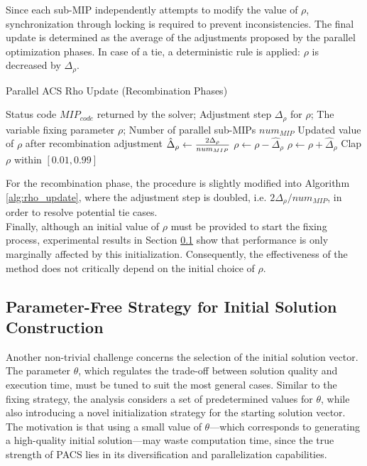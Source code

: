 Since each sub-MIP independently attempts to modify the value of $\rho$, synchronization through locking is required to prevent inconsistencies. The final update is determined as the average of the adjustments proposed by the parallel optimization phases. In case of a tie, a deterministic rule is applied: $\rho$ is decreased by $\Delta_\rho$.  
\begin{algorithm}[H]
\caption{Parallel ACS Rho Update (Recombination Phases)}\label{alg:rho_update}
\begin{algorithmic}[1]
\Require Status code $MIP_{code}$ returned by the solver; Adjustment step $\Delta_\rho$ for $\rho$; The variable fixing parameter $\rho$; Number of parallel sub-MIPs $num_{MIP}$
\Ensure Updated value of $\rho$ after recombination adjustment
    \State $\hat\Delta_\rho \gets {2\Delta_\rho \over{num_{MIP}}}$
        \State $\rho \gets \rho - \hat\Delta_\rho$
    \EndIf
        \State $\rho \gets \rho + \hat\Delta_\rho$
    \EndIf
    \State Clap $\rho$ within $[0.01,0.99]$
\EndFunction
\end{algorithmic}
\end{algorithm}
For the recombination phase, the procedure is slightly modified into Algorithm \ref{alg:rho_update}, where the adjustment step is doubled, i.e. $2\Delta_\rho / num_{MIP}$, in order to resolve potential tie cases.\\
Finally, although an initial value of $\rho$ must be provided to start the fixing process, experimental results in Section \ref{} show that performance is only marginally affected by this initialization. Consequently, the effectiveness of the method does not critically depend on the initial choice of $\rho$.

\subsection{Parameter-Free Strategy for Initial Solution Construction}
Another non-trivial challenge concerns the selection of the initial solution vector. The parameter $\theta$, which regulates the trade-off between solution quality and execution time, must be tuned to suit the most general cases. Similar to the fixing strategy, the analysis considers a set of predetermined values for $\theta$, while also introducing a novel initialization strategy for the starting solution vector.  
The motivation is that using a small value of $\theta$—which corresponds to generating a high-quality initial solution—may waste computation time, since the true strength of PACS lies in its diversification and parallelization capabilities.  

